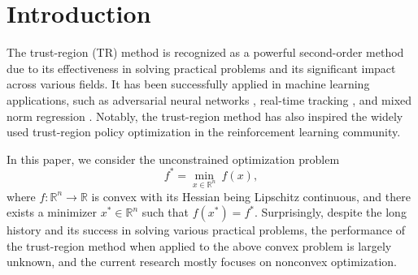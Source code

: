 \documentclass{article}
\theoremstyle{plain}
\theoremstyle{definition}
\theoremstyle{remark}
\begin{document}
\printAffiliationsAndNotice{}  %

\begin{abstract}
    Trust-region-type methods are popular schemes in machine learning due to their excellent practical performance. As accelerating classic algorithms is a fundamental issue in optimization as well as in machine learning, people may wonder if there remains some room for trust-region-type methods to improve. However, the ball-constrained subproblems pose significant obstacles to complexity analysis, making it a daunting task to devise acceleration schemes.
    In this paper, we show for the first time that trust-region-type methods can be accelerated both theoretically and numerically for convex optimization.
    In theory, we prove that our accelerated method has an improved global iteration complexity of $O(\epsilon^{-1/3})$. Numerically, our experiments demonstrate that the proposed algorithm achieves performance comparable to Nesterov's accelerated cubic Newton method, while consistently outperforming non-accelerated trust-region-type methods and the cubic Newton method.
\end{abstract}

\section{Introduction}
\label{Intro}
The trust-region (TR) method \cite{More1983,conn2000trust} is recognized as a powerful second-order method due to its effectiveness in solving practical problems and its significant impact across various fields. It has been successfully applied in machine learning applications, such as adversarial neural networks \cite{yao2019trust}, real-time tracking \cite{liu2004real}, and mixed norm regression \cite{kim2010scalable}. Notably, the trust-region method has also inspired the widely used trust-region policy optimization \cite{schulman2015trust, kurutach2018model} in the reinforcement learning community.

In this paper, we consider the unconstrained optimization problem \begin{equation} \label{eq.main problem} f^* = \min_{x\in \mathbb{R}^n}~ f(x), \end{equation} where $f:\mathbb{R}^n\to \mathbb{R}$ is convex with its Hessian being Lipschitz continuous, and there exists a minimizer $x^* \in \mathbb{R}^n$ such that $f(x^*)=f^*$.
Surprisingly, despite the long history and its success in solving various practical problems, the performance of the trust-region method when applied to the above convex problem is largely unknown, and the current research mostly focuses on nonconvex optimization.
\end{document}
